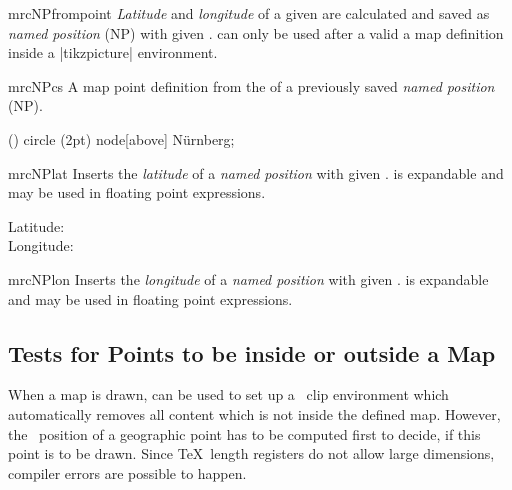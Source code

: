 \begin{docCommand}{mrcNPfrompoint}{}
  \emph{Latitude} and \emph{longitude} of a given  are
  calculated and saved as \emph{named position} (NP) with given .
   can only be used after a valid a map definition
  inside a |tikzpicture| environment.
  \begin{dispListing}
  \end{dispListing}
\end{docCommand}


\begin{docCommand}{mrcNPcs}{}
  A map point definition from the  of a previously saved
  \emph{named position} (NP).
  \begin{dispListing}
    \fill () circle (2pt) node[above] {N\"urnberg};
  \end{dispListing}
\end{docCommand}


\begin{docCommand}{mrcNPlat}{}
  Inserts the \emph{latitude} of a \emph{named position} with given .
   is expandable and may be used in floating point expressions.
  \begin{dispExample}
    Latitude: \\
    Longitude: 
  \end{dispExample}
\end{docCommand}


\begin{docCommand}{mrcNPlon}{}
  Inserts the \emph{longitude} of a \emph{named position} with given .
   is expandable and may be used in floating point expressions.
\end{docCommand}


\clearpage
\subsection{Tests for Points to be inside or outside a Map}

When a map is drawn,  can be used to set up a
\tikzname\ clip environment which automatically removes all content which
is not inside the defined map. However, the \tikzname\ position of a geographic
point has to be computed first to decide, if this point is to be drawn.
Since \TeX\ length registers do not allow large dimensions, compiler errors
are possible to happen.

